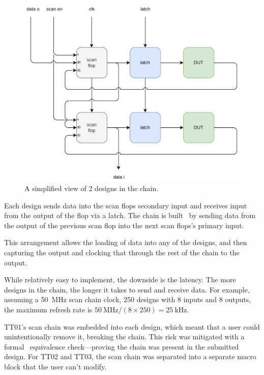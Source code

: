 \begin{figure}[!t]
\centering
\includegraphics[width=\columnwidth]{./Figs/scanchain_block_diagram.png}
\caption{A simplified view of 2 designs in the chain.}
\label{fig:simplified_view_2_designs}
\end{figure}

Each design sends data into the scan flops secondary input and receives input from the output of the flop via a latch.
The chain is built~\cite{updateiodesign} by sending data from the output of the previous scan flop into the next scan flops’s primary input.

This arrangement allows the loading of data into any of the designs, and then capturing the output and clocking that through the rest of the chain to the output.

While relatively easy to implement, the downside is the latency.
The more designs in the chain, the longer it takes to send and receive data.
For example, assuming a \qty{50}{\MHz} scan chain clock, 250 designs with 8 inputs and 8 outputs, the maximum refresh rate is $\qty{50}{\MHz} / (8 \times 250) = \qty{25}{\kHz}$.

TT01’s scan chain was embedded into each design, which meant that a user could unintentionally remove it, breaking the chain.
This risk was mitigated with a formal~\cite{tinytapeoutscan} equivalence check---proving the chain was present in the submitted design.
For TT02 and TT03, the scan chain was separated into a separate macro block that the user can’t modify.

